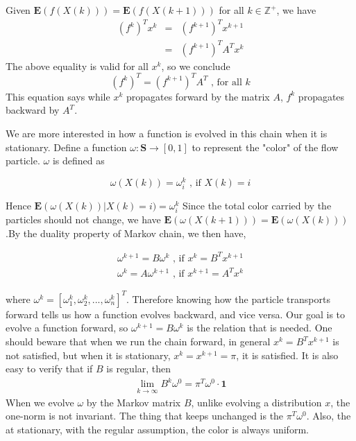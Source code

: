  Given $\mathbf{E}\left(f(X(k))\right) = \mathbf{E}\left(f(X(k+1))\right)$ for all $k \in \mathbb{Z}^+$, we have
\begin{eqnarray*}
(f^k)^T x^k & = & (f^{k+1})^T x^{k+1}\\
            & = & (f^{k+1})^T A^T x^{k}
\end{eqnarray*} 
The above equality is valid for all $x^k$, so we conclude 
\begin{equation*}
(f^k)^T = (f^{k+1})^T A^T  \mbox{ , for all } k 
\end{equation*}
This equation says while $x^k$ propagates forward by the matrix $A$, $f^k$ propagates backward by $A^T$.  


 We are more interested in how a function is evolved in this chain when it is stationary. Define a function $\omega: \mathbf{S} \rightarrow [0,1]$ to represent the "color" of the flow particle. $\omega$ is defined as

  \begin{equation*}
    \omega(X(k)) = \omega_i^k \mbox{ , if } X(k) = i
  \end{equation*}

Hence $\mathbf{E}\left(\omega(X(k))\right|X(k)=i) = \omega_i^k $
Since the total color carried by the particles should not change, we have $\mathbf{E}\left(\omega(X(k+1))\right) = \mathbf{E}\left(\omega(X(k))\right)$.By the duality property of Markov chain, we then have, 

  \begin{eqnarray*}
     \omega^{k+1} = B \omega^k     \mbox{   , if   } x^{k} = B^T x^{k+1}   \\
     \omega^{k} = A \omega^{k+1}   \mbox{   , if   } x^{k+1} = A^T x^{k} 
  \end{eqnarray*}

where $\omega^k = [\omega^k_1,\omega^k_2,...,\omega^k_n]^T$. Therefore knowing how the particle transports forward tells us how a function evolves backward, and vice versa. Our goal is to evolve a function forward, so $\omega^{k+1} = B \omega^k$ is the relation that is needed. One should beware that when we run the chain forward, in general $x^{k} = B^T x^{k+1}$ is not satisfied, but when it is stationary, $x^{k} = x^{k+1} = \pi $, it is satisfied.   
It is also easy to verify that if $B$ is regular, then
   \begin{eqnarray*}
     \lim_{k\to\infty} B^{k}\omega^{0} = {\pi^T\omega^{0}}\cdot\mathbf{1}  
   \end{eqnarray*}
When we evolve $\omega$ by the Markov matrix $B$, unlike evolving a distribution $x$, the one-norm is not invariant. The thing that keeps unchanged is the $\pi^T\omega^{0}$. Also, the at stationary, with the regular assumption, the color is always uniform. 
